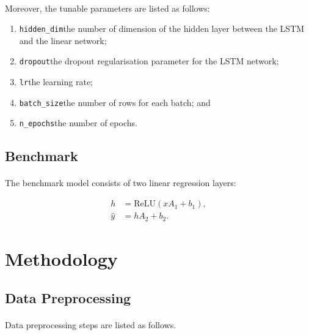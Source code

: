 \documentclass[12pt, letterpaper]{article}
\begin{document}
\paragraph{}
Moreover, the tunable parameters are listed as follows:

\begin{enumerate}
    \item \texttt{hidden\_dim}\quad the number of dimension of the hidden layer between the LSTM and the linear network;
    \item \texttt{dropout}\quad the dropout regularisation parameter for the LSTM network;
    \item \texttt{lr}\quad the learning rate;
    \item \texttt{batch\_size}\quad the number of rows for each batch; and
    \item \texttt{n\_epochs}\quad the number of epochs.
\end{enumerate}

\subsection{Benchmark}

\paragraph{}
The benchmark model consists of two linear regression layers:

\begin{align*}
    h & =\mathrm{ReLU}\left(xA_1+b_1\right), \\
    \hat y & =hA_2+b_2.
\end{align*}

\section{Methodology} %

\subsection{Data Preprocessing}

\paragraph{}
Data preprocessing steps are listed as follows.
\end{document}
